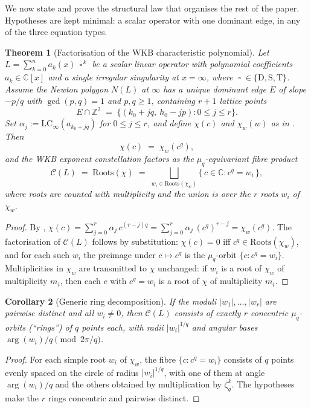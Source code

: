 \documentclass[aip,jmp,preprint,amsmath,amssymb,nofootinbib,floatfix]{revtex4-2}
\theoremstyle{plain}
\newtheorem{theorem}{Theorem}[section]
\newtheorem{corollary}[theorem]{Corollary}
\theoremstyle{definition}
\theoremstyle{remark}
\newcommand{\op}{\mathop{\square}}                %
\newcommand{\opD}{\mathrm{D}}                     %
\newcommand{\opS}{\mathrm{S}}                     %
\newcommand{\opT}{\mathrm{T}}                     %
\newcommand{\LCinf}{\mathrm{LC}_\infty}
\newcommand{\Roots}{\mathrm{Roots}}
\newcommand{\NL}{N(L)}
\newcommand{\Cl}{\mathcal{C}}
\DeclareMathOperator{\arginline}{arg}
\begin{document}
We now state and prove the structural law that organises the rest of the
paper. Hypotheses are kept minimal: a scalar operator with one dominant
edge, in any of the three equation types.

\begin{theorem}[Factorisation of the WKB characteristic polynomial]\label{thm:main}
Let $L = \sum_{k=0}^{n} a_k(x)\, \op^{\,k}$ be a scalar linear operator with
polynomial coefficients $a_k \in \mathbb{C}[x]$ and a single irregular
singularity at $x = \infty$, where $\op \in \{\opD, \opS, \opT\}$. Assume
the Newton polygon $\NL$ at $\infty$ has a unique dominant edge $E$ of
slope $-p/q$ with $\gcd(p, q) = 1$ and $p, q \ge 1$, containing $r + 1$
lattice points
\[
   E \cap \mathbb{Z}^2 \;=\;
   \big\{(k_0 + jq,\ h_0 - jp) : 0 \le j \le r\big\}.
\]
Set $\alpha_j := \LCinf(a_{k_0 + jq})$ for $0 \le j \le r$, and define
$\chi(c)$ and $\chi_w(w)$ as in . Then
\[
   \boxed{\,
     \chi(c) \;=\; \chi_w(c^q),
   \,}
\]
and the WKB exponent constellation factors as the $\mu_q$-equivariant
fibre product
\[
   \Cl(L) \;=\; \Roots(\chi)
   \;=\;
   \bigsqcup_{w_i \in \Roots(\chi_w)}
   \big\{\, c \in \mathbb{C} : c^q = w_i \,\big\},
\]
where roots are counted with multiplicity and the union is over the $r$
roots $w_i$ of $\chi_w$.
\end{theorem}

\begin{proof}
By ,
$\chi(c) = \sum_{j=0}^{r} \alpha_j\, c^{(r-j) q}
       = \sum_{j=0}^{r} \alpha_j\, (c^q)^{r-j}
       = \chi_w(c^q).$
The factorisation of $\Cl(L)$ follows by substitution: $\chi(c) = 0$ iff
$c^q \in \Roots(\chi_w)$, and for each such $w_i$ the preimage under
$c \mapsto c^q$ is the $\mu_q$-orbit $\{c : c^q = w_i\}$. Multiplicities
in $\chi_w$ are transmitted to $\chi$ unchanged: if $w_i$ is a root of
$\chi_w$ of multiplicity $m_i$, then each $c$ with $c^q = w_i$ is a root
of $\chi$ of multiplicity $m_i$.
\end{proof}

\begin{corollary}[Generic ring decomposition]\label{cor:ring}
If the moduli $|w_1|, \dots, |w_r|$ are pairwise distinct and all
$w_i \ne 0$, then $\Cl(L)$ consists of exactly $r$ concentric
$\mu_q$-orbits (``rings'') of $q$ points each, with radii $|w_i|^{1/q}$
and angular bases $\arginline(w_i) / q \pmod{2\pi/q}$.
\end{corollary}

\begin{proof}
For each simple root $w_i$ of $\chi_w$, the fibre $\{c : c^q = w_i\}$
consists of $q$ points evenly spaced on the circle of radius
$|w_i|^{1/q}$, with one of them at angle $\arginline(w_i)/q$ and the others
obtained by multiplication by $\zeta_q^k$. The hypotheses make the
$r$ rings concentric and pairwise distinct.
\end{proof}
\end{document}
